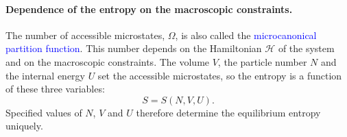 \paragraph{Dependence of the entropy on the macroscopic constraints.}
The number of accessible microstates, $\Omega$, is also called the
\textcolor{blue}{microcanonical partition function}. This number depends on the
Hamiltonian $\mathcal{H}$ of the system and on the macroscopic constraints.
The volume $V$, the particle number $N$ and the internal energy $U$ set the
accessible microstates, so the entropy is a function of these three
variables:
\begin{equation}
    \boxed{S = S(N,V,U).}
\end{equation}
Specified values of $N$, $V$ and $U$ therefore determine the equilibrium
entropy uniquely.
